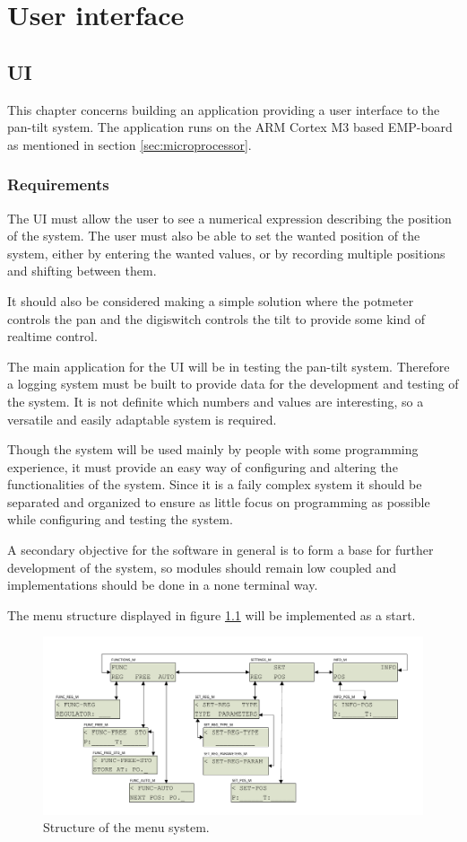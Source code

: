 \chapter{User interface}\label{chap:ui}

\section{UI}
This chapter concerns building an application providing a user interface to the
pan-tilt system. The application runs on the ARM Cortex M3 based EMP-board
as mentioned in section \ref{sec:microprocessor}.

\subsection{Requirements}
The UI must allow the user to see a numerical expression
describing the position of the system. The user must also be able to set the
wanted position of the system, either by entering the wanted values, or by
recording multiple positions and shifting between them.

It should also be considered making a simple solution where the potmeter
controls the pan and the digiswitch controls the tilt to provide some kind of
realtime control.

The main application for the UI will be in testing the pan-tilt system.
Therefore a logging system must be built to provide data for the development
and testing of the system. It is not definite which numbers and values are
interesting, so a versatile and easily adaptable system is required.

Though the system will be used mainly by people with some programming
experience, it must provide an easy way of configuring and altering the functionalities of the system. Since it is a faily complex system it should be separated and organized to ensure as little focus on programming as possible while configuring and testing the system.

A secondary objective for the software in general is to form a base for further development of the system, so modules should remain low coupled and implementations should be done in a none terminal way.

The  menu structure displayed in figure \ref{fig:ui_menu_structure} will be implemented as a start.

\begin{figure}[htb]
	\centering
	\includegraphics[width=\textwidth,trim=0 0 0 0]{graphics/menu_structure.pdf} 
	\caption{Structure of the menu system.}
	\label{fig:ui_menu_structure}
\end{figure}

